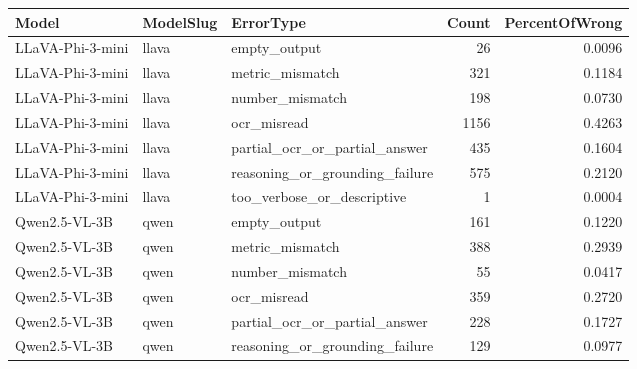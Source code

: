 \begin{tabular}{lllrr}
\toprule
Model & ModelSlug & ErrorType & Count & PercentOfWrong \\
\midrule
LLaVA-Phi-3-mini & llava & empty_output & 26 & 0.0096 \\
LLaVA-Phi-3-mini & llava & metric_mismatch & 321 & 0.1184 \\
LLaVA-Phi-3-mini & llava & number_mismatch & 198 & 0.0730 \\
LLaVA-Phi-3-mini & llava & ocr_misread & 1156 & 0.4263 \\
LLaVA-Phi-3-mini & llava & partial_ocr_or_partial_answer & 435 & 0.1604 \\
LLaVA-Phi-3-mini & llava & reasoning_or_grounding_failure & 575 & 0.2120 \\
LLaVA-Phi-3-mini & llava & too_verbose_or_descriptive & 1 & 0.0004 \\
Qwen2.5-VL-3B & qwen & empty_output & 161 & 0.1220 \\
Qwen2.5-VL-3B & qwen & metric_mismatch & 388 & 0.2939 \\
Qwen2.5-VL-3B & qwen & number_mismatch & 55 & 0.0417 \\
Qwen2.5-VL-3B & qwen & ocr_misread & 359 & 0.2720 \\
Qwen2.5-VL-3B & qwen & partial_ocr_or_partial_answer & 228 & 0.1727 \\
Qwen2.5-VL-3B & qwen & reasoning_or_grounding_failure & 129 & 0.0977 \\
\bottomrule
\end{tabular}
